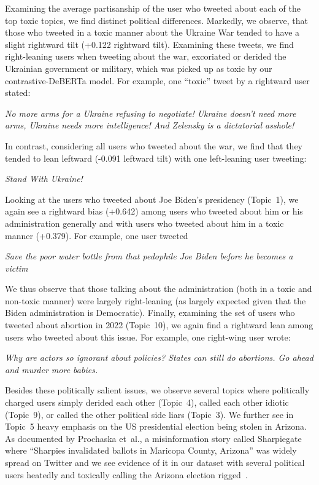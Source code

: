 Examining the average partisanship of the user who tweeted about each of the top toxic topics, we find distinct political differences. Markedly, we observe, that those who tweeted in a toxic manner about the Ukraine War tended to have a slight rightward tilt (+0.122 rightward tilt). Examining these tweets, we find right-leaning users when tweeting about the war, excoriated or derided the Ukrainian government or military, which was picked up as toxic by our contrastive-DeBERTa model. 
For example, one ``toxic'' tweet by a rightward user stated: 
\begin{displayquote}
\small
\textit{
No more arms for a Ukraine refusing to negotiate! Ukraine doesn't need more arms, Ukraine needs more intelligence! And Zelensky is a dictatorial asshole!}

\end{displayquote}
In contrast, considering all users who tweeted about the war, we find that they tended to lean leftward (-0.091 leftward tilt) with one left-leaning user tweeting:
\begin{displayquote}
\small
\textit{
Stand With Ukraine!}
\end{displayquote}
Looking at the users who tweeted about Joe Biden's presidency (Topic~1),  we again see a rightward bias (+0.642) among users who tweeted about him or his administration generally and with users who tweeted about him in a toxic manner (+0.379). For example, one user tweeted
\begin{displayquote}
\small
\textit{
Save the poor water bottle from that pedophile Joe Biden before he becomes a victim}
\end{displayquote} We thus observe that those talking about the administration (both in a toxic and non-toxic manner) were largely right-leaning (as largely expected given that the Biden administration is Democratic). Finally, examining the set of users who tweeted about abortion in 2022 (Topic~10), we again find a rightward lean among users who tweeted about this issue. For example, one right-wing user wrote:
\begin{displayquote}
\small
\textit{Why are actors so ignorant about policies? States can still do abortions. Go ahead and murder more babies.}
\end{displayquote}



Besides these politically salient issues, we observe several topics where politically charged users simply derided each other (Topic~4), called each other idiotic (Topic~9), or called the other political side liars (Topic~3). We further see in Topic~5 heavy emphasis on the US presidential election being stolen in Arizona. As documented by Prochaska et~al., a misinformation story called Sharpiegate where ``Sharpies invalidated ballots in Maricopa County, Arizona'' was widely spread on Twitter and we see evidence of it in our dataset with several political users heatedly and toxically calling the Arizona election rigged~\cite{prochaska2023mobilizing}.





